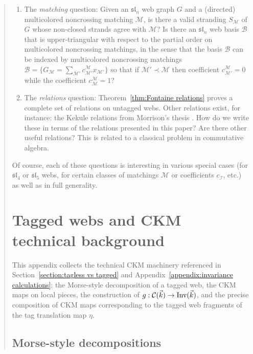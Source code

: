 \documentclass[letterpaper,11pt]{amsart}
\begin{document}
\begin{abstract}
\begin{enumerate}
    \item The \emph{matching} question: Given an $\mathfrak{sl}_n$ web graph $G$ and a (directed) multicolored noncrossing matching $\mathcal{M}$, is there a valid stranding $S_\mathcal{M}$ of $G$ whose non-closed strands agree with $\mathcal{M}$? Is there an $\mathfrak{sl}_n$ web basis $\mathcal{B}$ that is upper-triangular with respect to the partial order on multicolored noncrossing matchings, in the sense that the basis $\mathcal{B}$ can be indexed by multicolored noncrossing matchings $\mathcal{B} = \Big\{ G_\mathcal{M} = \sum_{\mathcal{M}'} c_{\mathcal{M}'}^{\mathcal{M}} x_{\mathcal{M}'}\Big\}$ so that if $\mathcal{M}' \prec \mathcal{M}$ then coefficient $c_{\mathcal{M}'}^{\mathcal{M}} = 0$ while the coefficient $c_{\mathcal{M}}^{\mathcal{M}} = 1$?
    \item The \emph{relations} question: Theorem~\ref{thm:Fontaine relations} proves a complete set of relations on untagged webs.  Other relations exist, for instance: the Kekule relations from Morrison's thesis \cite{MorrisonThesis}. How do we write these in terms of the relations presented in this paper?  Are there other useful relations?  This is related to a classical problem in commutative algebra.
\end{enumerate}

Of course, each of these questions is interesting in various special cases (for $\mathfrak{sl}_4$ or $\mathfrak{sl}_5$ webs, for certain classes of matchings $\mathcal{M}$ or coefficients $c_\mathcal{I}$, etc.) as well as in full generality.


 \appendix {} 

\section{Tagged webs and CKM technical background}\label{appendix:tagged ckm background}
 
This appendix collects the technical CKM machinery referenced in Section~\ref{section:tagless vs tagged} and Appendix~\ref{appendix:invariance calculations}: the Morse-style decomposition of a tagged web, the CKM maps on local pieces, the construction of $g:\mathcal{C}(\vec{k})\to\textup{Inv}(\vec{k})$, and the precise composition of CKM maps corresponding to the tagged web fragments of the tag translation map $\eta$.
 
\subsection{Morse-style decompositions}\label{appendix: morse}
 

\end{abstract}
\end{document}
